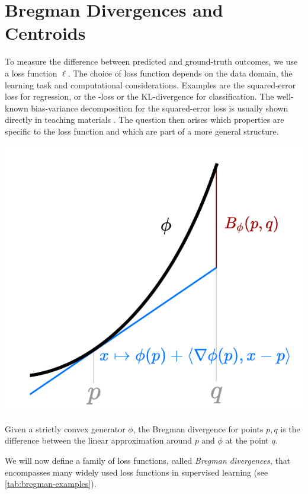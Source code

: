 \documentclass[
	twoside=false, %
]{kaobook}
\begin{document}
\section{Bregman Divergences and Centroids}

To measure the difference between predicted and ground-truth outcomes, we use a loss function $\ell$. The choice of loss function depends on the data domain, the learning task and computational considerations. 
Examples are the squared-error loss \cite{scornet_ConsistencyRandomForests_2015} for regression, or the \zeroone-loss \cite{theisen_WhenAreEnsembles_2023} or the KL-divergence \cite{webb_EnsembleNotEnsemble_2019} for classification. The well-known bias-variance decomposition for the squared-error loss is usually shown directly in teaching materials \cite{tibshirani_ElementsStatisticalLearning_2017, weinberger_Lecture12Bias_}. The question then arises which properties are specific to the loss function and which are part of a more general structure.
\begin{marginfigure} \label{fig:bregman-div-intuition}
    \includegraphics[width=\textwidth]{figma-illustrations/bregman-div-intuition}
    \caption{Given a strictly convex generator $\phi$, the Bregman divergence for points $p, q$ is the difference between the linear approximation around $p$ and $\phi$ at the point $q$. }
\end{marginfigure}
We will now define a family of loss functions, called \textit{Bregman divergences}, that encompasses many widely used loss functions in supervised learning (see \cref{tab:bregman-examples}). 
\end{document}
